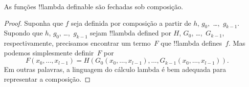 \documentclass[../../../include/open-logic-section]{subfiles}
\begin{document}

\begin{lem}
As funções !!{lambda definable} são fechadas sob composição.
\end{lem}

\begin{proof}
Suponha que $f$ seja definida por composição a partir de $h$, $g_0,$
\dots,~$g_{k-1}$. Supondo que $h$, $g_0$, \dots,~$g_{k-1}$ sejam
!!{lambda defined} por $H$, $G_0$, \dots,~$G_{k-1}$, respectivamente,
precisamos encontrar um termo~$F$ que !!{lambda define}s~$f$. Mas podemos
simplesmente definir~$F$ por
\[
F(x_0, \dots, x_{l-1}) = H(G_0(x_0, \dots, x_{l-1}),
\dots, G_{k-1}(x_0, \dots, x_{l-1})).
\]
Em outras palavras, a linguagem do cálculo lambda é bem adequada para
representar a composição.
\end{proof}
\end{document}

